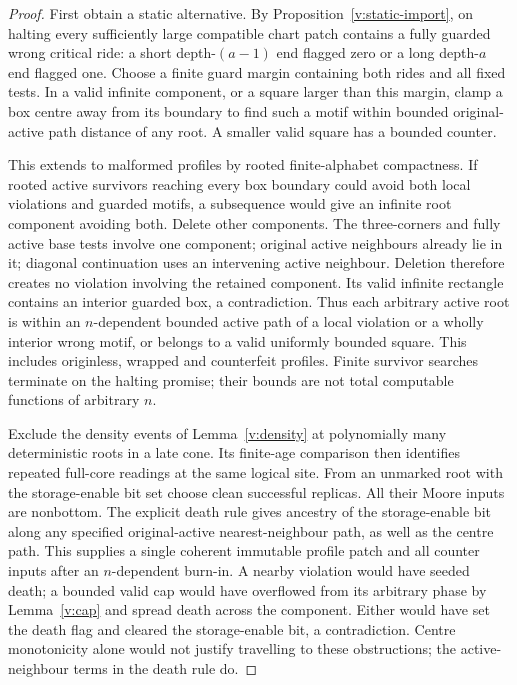 \begin{proof}
First obtain a static alternative. By
Proposition~\ref{v:static-import}, on halting every
sufficiently large compatible chart patch contains a fully guarded wrong
critical ride: a short depth-\((a-1)\) end flagged zero or a long
 depth-\(a\) end flagged one. Choose a finite guard margin containing
both rides and all fixed tests. In a valid infinite component, or a
square larger than this margin, clamp a box centre away from its
boundary to find such a motif within bounded original-active path
distance of any root. A smaller valid square has a bounded counter.

This extends to malformed profiles by rooted finite-alphabet
compactness. If rooted active survivors reaching every box boundary
could avoid both local violations and guarded motifs, a subsequence
would give an infinite root component avoiding both. Delete other
components. The three-corners and fully active base tests involve one
component; original active neighbours already lie in it; diagonal
continuation uses an intervening active neighbour. Deletion therefore
creates no violation involving the retained component. Its valid
infinite rectangle contains an interior guarded box, a contradiction.
Thus each arbitrary active root is within an \(n\)-dependent bounded
active path of a local violation or a wholly interior wrong motif, or
belongs to a valid uniformly bounded square. This includes originless,
wrapped and counterfeit profiles. Finite survivor searches terminate
on the halting promise; their bounds are not total computable functions
of arbitrary \(n\).

Exclude the density events of Lemma~\ref{v:density} at polynomially
many deterministic roots in a late cone. Its finite-age comparison
then identifies repeated full-core readings at the same logical site.
From an unmarked root with the storage-enable bit set choose clean successful replicas.
All their Moore inputs are nonbottom. The explicit death rule gives
ancestry of the storage-enable bit along any specified original-active nearest-neighbour
path, as well as the centre path. This supplies a single coherent
immutable profile patch and all counter inputs after an \(n\)-dependent
burn-in. A nearby violation would have seeded death; a bounded valid
cap would have overflowed from its arbitrary phase by Lemma~\ref{v:cap}
and spread death across the component. Either would have set the death flag and cleared the storage-enable bit, a contradiction.
Centre monotonicity alone would not justify travelling to these
obstructions; the active-neighbour terms in the death rule do.


\end{proof}
